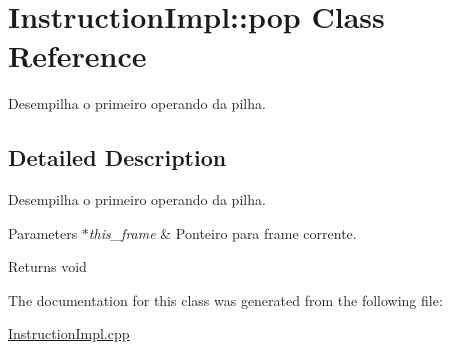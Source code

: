 \hypertarget{class_instruction_impl_1_1pop}{}\section{Instruction\+Impl\+:\+:pop Class Reference}
\label{class_instruction_impl_1_1pop}


Desempilha o primeiro operando da pilha.  




\subsection{Detailed Description}
Desempilha o primeiro operando da pilha. 


\begin{DoxyParams}{Parameters}
{\em $\ast$this\+\_\+frame} & Ponteiro para frame corrente. \\
\hline
\end{DoxyParams}
\begin{DoxyReturn}{Returns}
void 
\end{DoxyReturn}


The documentation for this class was generated from the following file\+:\begin{DoxyCompactItemize}
\item 
\hyperlink{_instruction_impl_8cpp}{Instruction\+Impl.\+cpp}\end{DoxyCompactItemize}

